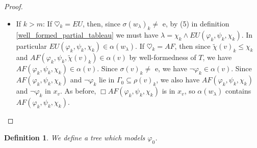 \documentclass[11pt]{article}
\newtheorem{definition}{Definition}[section]
\begin{document}
\begin{proof}
\begin{enumerate}[label=(\alph*)]
\begin{itemize}
            \item If $k>m$: If $\heartsuit_k = EU$, then, since $\sigma(w_\lambda)_k\not=$ e, by (5) in definition \ref{well_formed_partial_tableau} we must have $\lambda = \chi_k\wedge EU(\varphi_k,\psi_k,\chi_k)$. In particular $EU(\varphi_k,\psi_k,\chi_k)\in\alpha(w_\lambda)$. If $\heartsuit_k=AF$, then since $\tilde{\chi}(v)_k\leq\chi_k$ and $AF(\varphi_k,\psi_k,\tilde{\chi}(v)_k)\in\alpha(v)$ by well-formedness of $T$, we have $AF(\varphi_k,\psi_k,\chi_k)\in\alpha(v)$. Since $\sigma(v)_k\not=$ e, we have $\neg\varphi_k\in\alpha(v)$. Since $AF(\varphi_k,\psi_k,\chi_k)$ and $\neg\varphi_k$ lie in $\Gamma_0\subseteq\rho(v)_k$, we also have $AF(\varphi_k,\psi_k,\chi_k)$ and $\neg\varphi_k$ in $x_v$. As before, $\Box AF(\varphi_k,\psi_k,\chi_k)$ is in $x_v$, so $\alpha(w_\lambda)$ contains $AF(\varphi_k,\psi_k,\chi_k)$.
        \end{itemize}
    \end{enumerate}
\end{proof}
\begin{definition}\label{model_for_consistency}
    We define a tree which models $\varphi_0$.
\end{definition}


\end{document}
